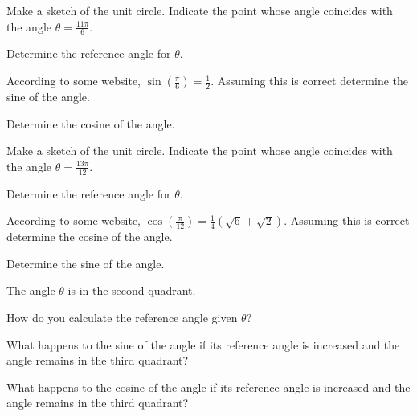 \begin{problem}
\item Make a sketch of the unit circle. Indicate the point whose angle
  coincides with the angle $\theta=\frac{11\pi}{6}$.
  \begin{subproblem}
    \item Determine the reference angle for $\theta$.
      \vfill
    \item According to some website,
    $\displaystyle{\sin\left(\frac{\pi}{6}\right)=\frac{1}{2}}$.
    Assuming this is correct determine the sine of the angle.
      \vfill
    \item Determine the cosine of the angle.
      \vfill
  \end{subproblem}

  \clearpage

  \item Make a sketch of the unit circle. Indicate the point whose angle
    coincides with the angle $\theta=\frac{13\pi}{12}$.
    \begin{subproblem}
      \item Determine the reference angle for $\theta$.
        \vfill
      \item According to some website,
      $\displaystyle{\cos\left(\frac{\pi}{12}\right)=\frac{1}{4}\left( \sqrt{6} + \sqrt{2}\right)}$.
      Assuming this is correct determine the cosine of the angle.
        \vfill
      \item Determine the sine of the angle.
        \vfill
    \end{subproblem}

    \clearpage

  \item The angle $\theta$ is in the second quadrant.
  \begin{subproblem}
    \item How do you calculate the reference angle given $\theta$?
      \vfill
    \item What happens to the sine of the angle if its reference angle is
      increased and the angle remains in the third quadrant?
      \vfill
    \item What happens to the cosine of the angle if its reference angle is
      increased and the angle remains in the third quadrant?
      \vfill
  \end{subproblem}

  \clearpage


\end{problem}
